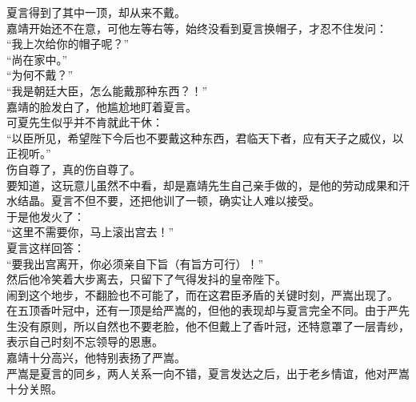 \begin{multicols}{\theparacolNo}
夏言得到了其中一顶，却从来不戴。\\

嘉靖开始还不在意，可他左等右等，始终没看到夏言换帽子，才忍不住发问：\\

“我上次给你的帽子呢？”\\

“尚在家中。”\\

“为何不戴？”\\

“我是朝廷大臣，怎么能戴那种东西？！”\\

嘉靖的脸发白了，他尴尬地盯着夏言。\\

可夏先生似乎并不肯就此干休：\\

“以臣所见，希望陛下今后也不要戴这种东西，君临天下者，应有天子之威仪，以正视听。”\\

伤自尊了，真的伤自尊了。\\

要知道，这玩意儿虽然不中看，却是嘉靖先生自己亲手做的，是他的劳动成果和汗水结晶。夏言不但不要，还把他训了一顿，确实让人难以接受。\\

于是他发火了：\\

“这里不需要你，马上滚出宫去！”\\

夏言这样回答：\\

“要我出宫离开，你必须亲自下旨（有旨方可行）！”\\

然后他冷笑着大步离去，只留下了气得发抖的皇帝陛下。\\

闹到这个地步，不翻脸也不可能了，而在这君臣矛盾的关键时刻，严嵩出现了。\\

在五顶香叶冠中，还有一顶是给严嵩的，但他的表现却与夏言完全不同。由于严先生没有原则，所以自然也不要老脸，他不但戴上了香叶冠，还特意罩了一层青纱，表示自己时刻不忘领导的恩惠。\\

嘉靖十分高兴，他特别表扬了严嵩。\\

严嵩是夏言的同乡，两人关系一向不错，夏言发达之后，出于老乡情谊，他对严嵩十分关照。\\


\end{multicols}
